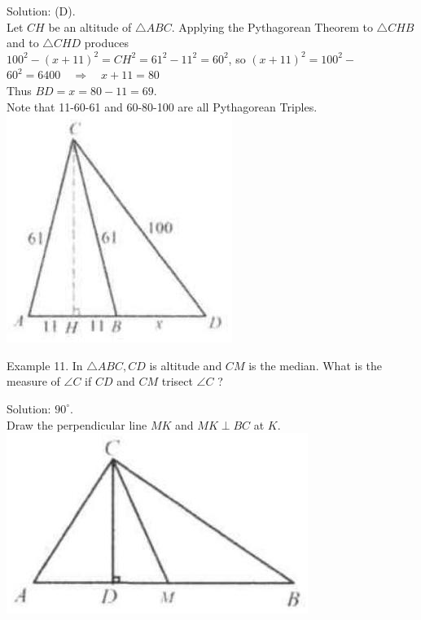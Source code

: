 \documentclass[10pt]{article}
\begin{document}
Solution: (D).\\
Let \(C H\) be an altitude of \(\triangle A B C\). Applying the Pythagorean Theorem to \(\triangle C H B\) and to \(\triangle C H D\) produces\\
\(100^{2}-(x+11)^{2}=C H^{2}=61^{2}-11^{2}=60^{2}\), so \((x+11)^{2}=100^{2}-\) \(60^{2}=6400 \quad \Rightarrow \quad x+11=80\)\\
Thus \(B D=x=80-11=69\).\\
Note that 11-60-61 and 60-80-100 are all Pythagorean Triples.\\
\includegraphics[max width=\textwidth, center]{2025_04_17_97bc1f7e44d93c271a88g-081}

Example 11. In \(\triangle A B C, C D\) is altitude and \(C M\) is the median. What is the measure of \(\angle C\) if \(C D\) and \(C M\) trisect \(\angle C\) ?

Solution: \(90^{\circ}\).\\
Draw the perpendicular line \(M K\) and \(M K \perp B C\) at \(K\).\\
\includegraphics[max width=\textwidth, center]{2025_04_17_97bc1f7e44d93c271a88g-081(3)}
\end{document}
